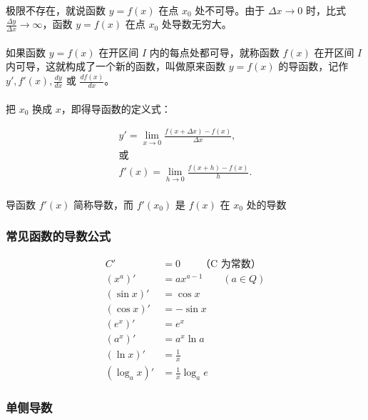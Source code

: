 \paragraph{}
极限不存在，就说函数 $y = f(x)$ 在点 $x_0$ 处不可导。由于 $\Delta x \to 0$ 时，比式 $\frac{\Delta y}{\Delta x} \to \infty$，函数 $y = f(x)$ 在点 $x_0$ 处导数无穷大。

\paragraph{}
如果函数 $y = f(x)$ 在开区间 $I$ 内的每点处都可导，就称函数 $f(x)$ 在开区间 $I$ 内可导，这就构成了一个新的函数，叫做原来函数 $y = f(x)$ 的导函数，记作 $y', f'(x), \frac{dy}{dx}$ 或 $\frac{df(x)}{dx}$。

\paragraph{}
把 $x_0$ 换成 $x$，即得导函数的定义式：

\begin{gather}
y' = \lim_{x \to 0}\frac{f(x + \Delta x) - f(x)}{\Delta x} , \\
\text{或} \\
f'(x) = \lim_{h \to 0} \frac{f(x + h) - f(x)}{h}.
\end{gather}

\paragraph{}
导函数 $f'(x)$ 简称导数，而 $f'(x_0)$ 是 $f(x)$ 在 $x_0$ 处的导数

\subsubsection{常见函数的导数公式}

\begin{align}
C' &= 0 \qquad \text{（C 为常数）} \\
(x^a)' &= ax^{a-1} \qquad \text{$(a \in Q)$} \\
(\sin x)' &= \cos x \\
(\cos x)' &= - \sin x \\
(e^x)' &= e^x \\
(a^x)' &= a^x \ln a \\
(\ln x)' &= \frac{1}{x} \\
(\log_a x)' &= \frac{1}{x}\log_a e
\end{align}

\subsubsection{单侧导数}
